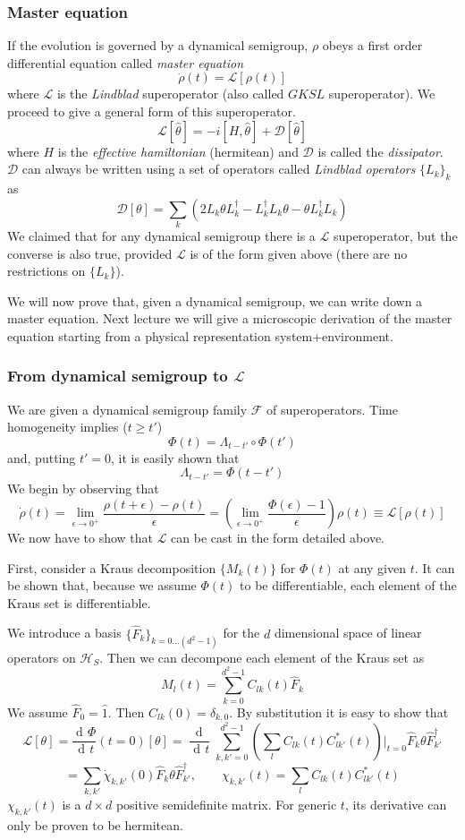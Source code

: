 \documentclass[a4paper, 11pt]{article}
\newcommand{\dd}{\mathop{\mathrm{d}\!}{}}
\newcommand{\deriv}[2]{\dfrac{\dd #1}{\dd #2}}
\newcommand{\HH}{\mathcal{H}}
\newcommand{\LL}{\mathcal{L}}
\begin{document}
	\subsubsection{Master equation}
	If the evolution is governed by a dynamical semigroup, $\rho$ obeys a first order differential equation called \emph{master equation}
	\[ \dot{\rho}(t) = \LL\left[ \rho(t) \right] \]
	where $\LL$ is the \emph{Lindblad} superoperator (also called $GKSL$ superoperator). We proceed to give a general form of this superoperator.
	\[ \LL[\hat{\theta}] = -i \left[H, \hat{\theta}\right] + \mathcal{D}[\hat{\theta}] \]
	where $H$ is the \emph{effective hamiltonian} (hermitean) and $\mathcal{D}$ is called the \emph{dissipator}. $\mathcal{D}$ can always be written using a set of operators called \emph{Lindblad operators} $\{ L_k \}_k$ as
	\[ \mathcal{D}[\theta] = \sum_k \left(2 L_k\theta L_k^\dagger - L_k^\dagger L_k \theta - \theta L_k^\dagger L_k \right) \]
	We claimed that for any dynamical semigroup there is a $\LL$ superoperator, but the converse is also true, provided $\LL$ is of the form given above (there are no restrictions on $\{L_k\}$).
	
	We will now prove that, given a dynamical semigroup, we can write down a master equation. Next lecture we will give a microscopic derivation of the master equation starting from a physical representation system+environment.
	
	\subsubsection{From dynamical semigroup to $\LL$}
	We are given a dynamical semigroup family $\mathcal{F}$ of superoperators. Time homogeneity implies ($t \ge t'$)
	\[ \Phi(t) = \Lambda_{t-t'} \circ \Phi(t') \]
	and, putting $t'=0$, it is easily shown that
	\[ \Lambda_{t-t'} = \Phi(t-t') \]
	We begin by observing that
	\[ \dot{\rho}(t) = \lim_{\epsilon\rightarrow 0^+} \dfrac{\rho(t+\epsilon)-\rho(t)}{\epsilon} = \left(\lim_{\epsilon\rightarrow 0^+}
	\dfrac{\Phi(\epsilon)-1}{\epsilon}\right) \rho(t) \equiv \LL[\rho(t)] \]
	We now have to show that $\LL$ can be cast in the form detailed above.
	
	First, consider a Kraus decomposition $\{M_k(t)\}$ for $\Phi(t)$ at any given $t$. It can be shown that, because we assume $\Phi(t)$ to be differentiable, each element of the Kraus set is differentiable.
	
	We introduce a basis $\{\hat{F}_k\}_{k=0\dots (d^2-1)}$ for the $d$ dimensional space of linear operators on $\HH_S$.
	Then we can decompone each element of the Kraus set as
	\[ M_l(t) = \sum_{k=0}^{d^2-1} C_{lk}(t) \hat{F}_k \]
	We assume $\hat{F}_0 = \hat{1}$. Then $C_{lk}(0) = \delta_{k,0}$. By substitution it is easy to show that
	\[ \LL[\theta] = \deriv{\Phi}{t}(t=0) [\theta] = \deriv{}{t} \sum_{k,k'=0}^{d^2-1} \left( \sum_l C_{lk}(t) C_{lk'}^*(t) \right)|_{t=0} \hat{F}_k \theta \hat{F}_{k'}^\dagger \]
	\[ = \sum_{k,k'} \dot{\chi}_{k,k'}(0) \hat{F}_k \theta \hat{F}_{k'}^\dagger,\qquad \chi_{k,k'}(t) = \sum_l C_{lk}(t) C_{lk'}^*(t) \]
	$\chi_{k,k'}(t)$ is a $d \times d$ positive semidefinite matrix. For generic $t$, its derivative can only be proven to be hermitean.
	
\end{document}
